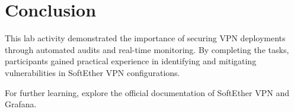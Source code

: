 \section{Conclusion}

This lab activity demonstrated the importance of securing VPN deployments through automated audits and real-time monitoring. By completing the tasks, participants gained practical experience in identifying and mitigating vulnerabilities in SoftEther VPN configurations.

For further learning, explore the official documentation of SoftEther VPN and Grafana.

